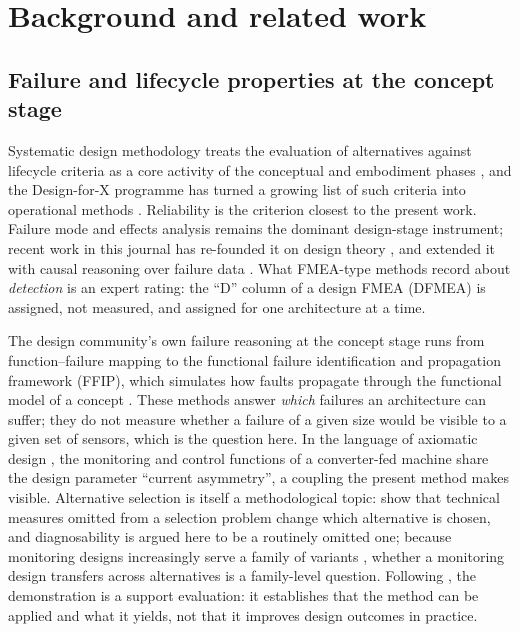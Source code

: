 \section{Background and related work}\label{sec:background}

\subsection{Failure and lifecycle properties at the concept stage}

Systematic design methodology treats the evaluation of alternatives against lifecycle criteria as a core activity of the conceptual and embodiment phases \citep{Pahl2007}, and the Design-for-X programme has turned a growing list of such criteria into operational methods \citep{Holt2010}. Reliability is the criterion closest to the present work. Failure mode and effects analysis remains the dominant design-stage instrument; recent work in this journal has re-founded it on design theory \citep{Cabanes2021}, and extended it with causal reasoning over failure data \citep{Liu2026afgnn}. What FMEA-type methods record about \emph{detection} is an expert rating: the ``D'' column of a design FMEA (DFMEA) is assigned, not measured, and assigned for one architecture at a time.

The design community's own failure reasoning at the concept stage runs from function--failure mapping \citep{Tumer2003, Stone2005} to the functional failure identification and propagation framework (FFIP), which simulates how faults propagate through the functional model of a concept \citep{Kurtoglu2008, Kurtoglu2010}. These methods answer \emph{which} failures an architecture can suffer; they do not measure whether a failure of a given size would be visible to a given set of sensors, which is the question here. In the language of axiomatic design \citep{Suh2001}, the monitoring and control functions of a converter-fed machine share the design parameter ``current asymmetry'', a coupling the present method makes visible. Alternative selection is itself a methodological topic: \citet{Eaton2026} show that technical measures omitted from a selection problem change which alternative is chosen, and diagnosability is argued here to be a routinely omitted one; because monitoring designs increasingly serve a family of variants \citep{Simpson2004}, whether a monitoring design transfers across alternatives is a family-level question. Following \citet{Blessing2009}, the demonstration is a support evaluation: it establishes that the method can be applied and what it yields, not that it improves design outcomes in practice.

